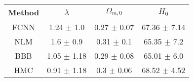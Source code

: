 \documentclass[convert={outext=.png}]{standalone}
\begin{document}
\centering
\label{tab:experimental_results}

\begin{tabular}{c c c c}

\hline
\hline
Method & $\lambda$ & $\Omega_{m,0}$ & $H_0$ \\ \hline
 FCNN & 1.24 $\pm$ 1.0 & 0.27 $\pm$ 0.07 & 67.36 $\pm$ 7.14 \\
 NLM  & 1.6 $\pm$ 0.9 & 0.31 $\pm$ 0.1 & 65.35 $\pm$ 7.2 \\
 BBB  & 1.05 $\pm$ 1.18 & 0.29 $\pm$ 0.08 & 65.01 $\pm$ 6.0 \\
 HMC  & 0.91 $\pm$ 1.18 & 0.3 $\pm$ 0.06 & 68.52 $\pm$ 4.52 \\
\hline
\hline
\end{tabular}
\end{document}
